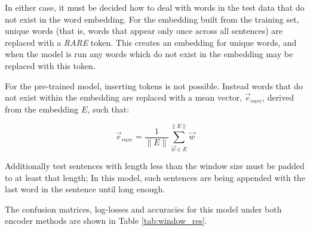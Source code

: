 In either case, it must be decided how to deal with words in the test data that do not exist in the word embedding. For the embedding built from the training set, unique words (that is, words that appear only once across all sentences) are replaced with a \textit{RARE} token. This creates an embedding for unique words, and when the model is run any words which do not exist in the embedding may be replaced with this token.

For the pre-trained model, inserting tokens is not possible. Instead words that do not exist within the embedding are replaced with a mean vector, $\vec{e}_{rare}$, derived from the embedding $E$, such that:

\begin{equation*}
\vec{e}_{rare} = \frac{1}{\lVert E \rVert} \sum\limits_{\vec{w} \in E}^{\lVert E \rVert} \vec{w}
\end{equation*}


Additionally test sentences with length less than the window size must be padded to at least that length; In this model, such sentences are being appended with the last word in the sentence until long enough.

The confusion matrices, log-losses and accuracies for this model under both encoder methods are shown in Table \ref{tab:window_res}.

